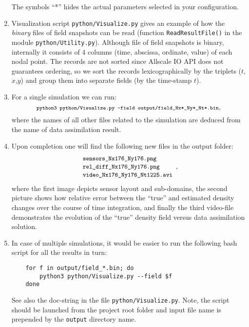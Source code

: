 \documentclass[]{article}
\begin{document}
\begin{enumerate}
The symbols ``*'' hides the actual parameters selected in your configuration.
\item Visualization script \texttt{python/Visualize.py} gives an example of how the \textit{binary} files of field snapshots can be read (function \texttt{ReadResultFile()} in the module \texttt{python/Utility.py}). Although file of field snapshots is binary, internally it consists of 4 columns (time, abscissa, ordinate, value) of each nodal point. The records are not sorted since Allscale IO API does not guarantees ordering, so we sort the records lexicographically by the triplets ($t$,$x$,$y$) and group them into separate fields (by the time-stamp $t$).
\item For a single simulation we can run:
$$
\mbox{\footnotesize\texttt{python3 python/Visualize.py --field  output/field\_Nx*\_Ny*\_Nt*.bin}},
$$
where the names of all other files related to the simulation are deduced from the name of data assimilation result.
\item Upon completion one will find the following new files in the output folder:
$$
\begin{array}{l}
\mbox{\small\texttt{sensors\_Nx176\_Ny176.png}} \\
\mbox{\small\texttt{rel\_diff\_Nx176\_Ny176.png}} \\
\mbox{\small\texttt{video\_Nx176\_Ny176\_Nt1225.avi}}
\end{array},
$$
where the first image depicts sensor layout and sub-domains, the second picture shows how relative error between the ``true'' and estimated density changes over the course of time integration, and finally the third video-file demonstrates the evolution of the ``true'' density field versus data assimilation solution.
\item In case of multiple simulations, it would be easier to run the following bash script for all the results in turn:
\begin{verbatim}
    for f in output/field_*.bin; do
        python3 python/Visualize.py --field $f
    done
\end{verbatim}
See also the doc-string in the file \texttt{python/Visualize.py}. Note, the script should be launched from the project root folder and input file name is prepended by the \texttt{output} directory name.
\end{enumerate}
\end{document}
